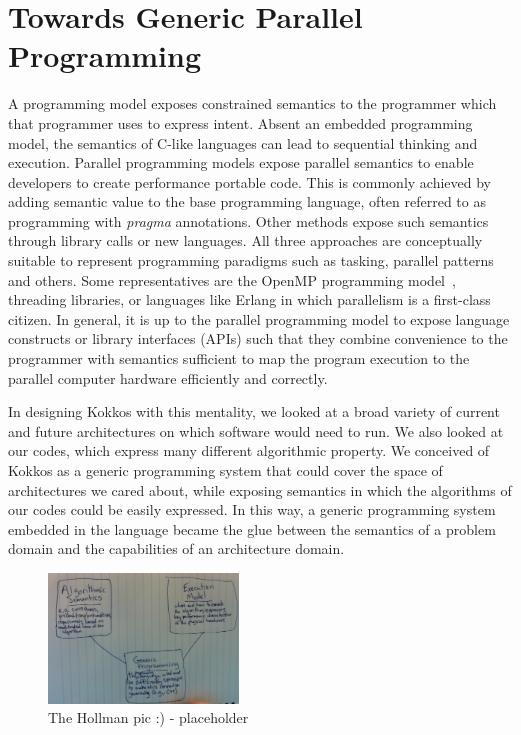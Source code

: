 \section{Towards Generic Parallel Programming}\label{chap:background}

A programming model exposes constrained semantics to the programmer which that programmer uses to express intent. Absent an embedded programming model, the semantics of C-like languages can lead to sequential thinking and execution. Parallel programming models expose parallel semantics to enable developers to create performance portable code. This is commonly achieved by adding semantic value to the base programming language, often referred to as programming with \emph{pragma} annotations. Other methods expose such semantics through library calls or new languages. All three approaches are conceptually suitable to represent programming paradigms such as tasking, parallel patterns and others. Some representatives are the OpenMP programming model~\cite{CITEOPENMP}, threading libraries, or languages like Erlang in which parallelism is a first-class citizen. In general, it is up to the parallel programming model to expose language constructs or library interfaces (APIs) such that they combine convenience to the programmer with semantics sufficient to map the program execution to the parallel computer hardware efficiently and correctly. 

In designing Kokkos with this mentality, we looked at a broad variety of current and future architectures on which software would need to run. We also looked at our codes, which express many different algorithmic property. We conceived of Kokkos as a generic programming system that could cover the space of architectures we cared about, while exposing semantics in which the algorithms of our codes could be easily expressed. In this way, a generic programming system embedded in the language became the glue between the semantics of a problem domain and the capabilities of an architecture domain.

\begin{figure}
\centerline{\includegraphics[width=0.45\textwidth]{img/Hollman.png}}
\caption{The Hollman pic :) - placeholder}
\label{fig}
\end{figure}

